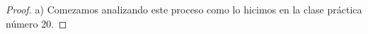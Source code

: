 \documentclass{article}
\DeclareMathOperator{\prob}{\mathbb{P}}
\DeclareMathOperator{\Expectation}{\mathbb{E}}
\DeclareMathOperator{\Exponential}{\textnormal{Exp}}
\DeclareMathOperator*{\argmin}{\textnormal{argmín}}
\newcommand{\naturalnum}{\mathbb{N}}
\theoremstyle{definition}
\begin{document}
\begin{proof} a)
Comezamos analizando este proceso como lo hicimos en la clase práctica número 20.







\end{proof}
\end{document}
